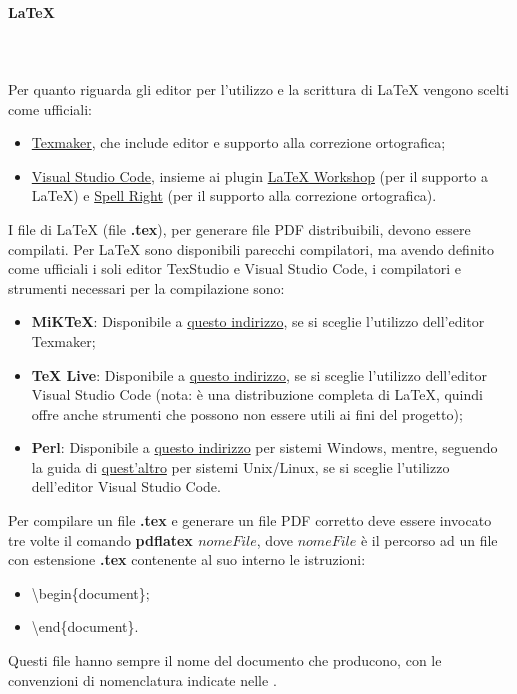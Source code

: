 \paragraph{\LaTeX}\mbox{} \\ \\
Per quanto riguarda gli editor per l'utilizzo e la scrittura di \LaTeX{} vengono scelti come ufficiali:
\begin{itemize}
	\item \href{https://www.xm1math.net/texmaker/}{Texmaker}, che include editor e supporto alla correzione ortografica;
	\item \href{https://code.visualstudio.com/}{Visual Studio Code}, insieme ai plugin \href{https://github.com/James-Yu/LaTeX-Workshop}{LaTeX Workshop} (per il supporto a \LaTeX) e \href{https://github.com/bartosz-antosik/vscode-spellright}{Spell Right} (per il supporto alla correzione ortografica).
\end{itemize}
I file di \LaTeX{} (file \textbf{.tex}), per generare file PDF distribuibili, devono essere compilati.
Per \LaTeX{} sono disponibili parecchi compilatori, ma avendo definito come ufficiali i soli editor TexStudio e Visual Studio Code,
i compilatori e strumenti necessari per la compilazione sono:
\begin{itemize}
    \item \textbf{MiKTeX}: Disponibile a \href{https://miktex.org/}{questo indirizzo}, se si sceglie l'utilizzo dell'editor Texmaker;
    \item \textbf{TeX Live}: Disponibile a \href{https://www.tug.org/texlive/}{questo indirizzo}, se si sceglie l'utilizzo dell'editor Visual Studio Code (nota: è una distribuzione completa di \LaTeX, quindi offre anche strumenti che possono non essere utili ai fini del progetto);
    \item \textbf{Perl}: Disponibile a \href{http://strawberryperl.com/}{questo indirizzo} per sistemi Windows, mentre, seguendo la guida di \href{https://learn.perl.org/installing/unix_linux.html}{quest'altro} per sistemi Unix/Linux, se si sceglie l'utilizzo dell'editor Visual Studio Code.
\end{itemize}
Per compilare un file \textbf{.tex} e generare un file PDF corretto deve essere invocato tre volte il comando \textbf{pdflatex $nomeFile$}, dove $nomeFile$ è il percorso ad un file con estensione \textbf{.tex} contenente al suo interno le istruzioni:
\begin{itemize}
    \item \textbackslash begin\{document\};
    \item \textbackslash end\{document\}.
\end{itemize}
Questi file hanno sempre il nome del documento che producono, con le convenzioni di nomenclatura indicate nelle \NdP{}.

